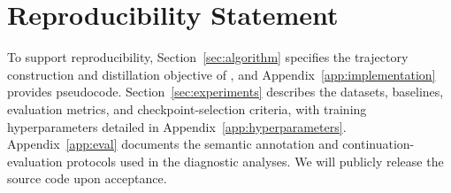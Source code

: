 \documentclass{article}
\theoremstyle{plain}
\newcommand{\method}{\text{TISD}}
\begin{document}
\section*{Reproducibility Statement}
To support reproducibility, Section~\ref{sec:algorithm} specifies the trajectory construction and distillation objective of \method{}, and Appendix~\ref{app:implementation} provides pseudocode. Section~\ref{sec:experiments} describes the datasets, baselines, evaluation metrics, and checkpoint-selection criteria, with training hyperparameters detailed in Appendix~\ref{app:hyperparameters}. Appendix~\ref{app:eval} documents the semantic annotation and continuation-evaluation protocols used in the diagnostic analyses. We will publicly release the source code upon acceptance.





\newpage
\appendix

\end{document}
